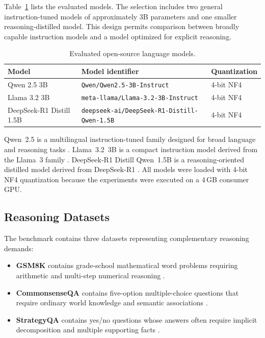 \documentclass{article}
\begin{document}
Table~\ref{tab:models} lists the evaluated models. The selection includes two general instruction-tuned models of approximately 3B parameters and one smaller reasoning-distilled model. This design permits comparison between broadly capable instruction models and a model optimized for explicit reasoning.

\begin{table}[h]
\centering
\caption{Evaluated open-source language models.}
\label{tab:models}
\begin{tabular}{lll}
\toprule
\textbf{Model} & \textbf{Model identifier} & \textbf{Quantization} \\
\midrule
Qwen 2.5 3B &
\texttt{Qwen/Qwen2.5-3B-Instruct} &
4-bit NF4 \\
Llama 3.2 3B &
\texttt{meta-llama/Llama-3.2-3B-Instruct} &
4-bit NF4 \\
DeepSeek-R1 Distill 1.5B &
\texttt{deepseek-ai/DeepSeek-R1-Distill-Qwen-1.5B} &
4-bit NF4 \\
\bottomrule
\end{tabular}
\end{table}

Qwen~2.5 is a multilingual instruction-tuned family designed for broad language and reasoning tasks \cite{qwen2024qwen25}. Llama~3.2~3B is a compact instruction model derived from the Llama~3 family \cite{grattafiori2024llama3}. DeepSeek-R1 Distill Qwen~1.5B is a reasoning-oriented distilled model derived from DeepSeek-R1 \cite{deepseek2025r1}. All models were loaded with 4-bit NF4 quantization because the experiments were executed on a 4\,GB consumer GPU.

\subsection{Reasoning Datasets}

The benchmark contains three datasets representing complementary reasoning demands:

\begin{itemize}
    \item \textbf{GSM8K} contains grade-school mathematical word problems requiring arithmetic and multi-step numerical reasoning \cite{cobbe2021gsm8k}.
    \item \textbf{CommonsenseQA} contains five-option multiple-choice questions that require ordinary world knowledge and semantic associations \cite{talmor2019commonsenseqa}.
    \item \textbf{StrategyQA} contains yes/no questions whose answers often require implicit decomposition and multiple supporting facts \cite{geva2021strategyqa}.
\end{itemize}
\end{document}
